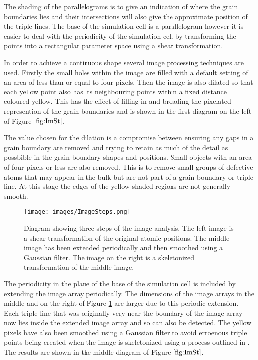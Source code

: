 \documentclass[12pt,a4paper]{book}
\begin{document}
The shading of the parallelograms is to give an indication of where the grain boundaries lies and their intersections will also give the approximate position of the triple lines. The base of the simulation cell is a parallelogram however it is easier to deal with the periodicity of the simulation cell by transforming the points into a rectangular parameter space using a shear transformation. 

In order to achieve a continuous shape several image processing techniques are used. Firstly the small holes within the image are filled with a default setting of an area of less than or equal to four pixels. Then the image is also dilated so that each yellow point also has its neighbouring points within a fixed distance coloured yellow. This has the effect of filling in and broading the pixelated represention of the grain boundaries and is shown in the first diagram on the left of Figure $\ref{fig:ImSt}$. 

The value chosen for the dilation is a compromise between ensuring any gaps in a grain boundary are removed and trying to retain as much of the detail as possbible in the grain boundary shapes and positions. Small objects with an area of four pixels or less are also removed. This is to remove small groups of defective atoms that may appear in the bulk but are not part of a grain boundary or triple line. At this stage the edges of the yellow shaded regions are not generally smooth.

 
\begin{figure}[H]
	\centering
	\texttt{[image: images/ImageSteps.png]} 
	\caption{Diagram showing three steps of the image analysis. The left image is a shear transformation of the original atomic positions. The middle image has been extended periodically and then smoothed using a Gaussian filter. The image on the right is a skeletonized transformation of the middle image.}  
	\label{fig:ImSt}
\end{figure}


The periodicity in the plane of the base of the simulation cell is included by extending the image array periodically. The dimensions of the image arrays in the middle and on the right of Figure \ref{fig:ImSt} are larger due to this periodic extension. Each triple line that was originally very near the boundary of the image array now lies inside the extended image array and so can also be detected. The yellow pixels have also been smoothed using a Gaussian filter to avoid erroenous triple points being created when the image is skeletonized using a process outlined in \cite{ZHANG1997}. The results are shown in the middle diagram of Figure $\ref{fig:ImSt}$.  
\end{document}
